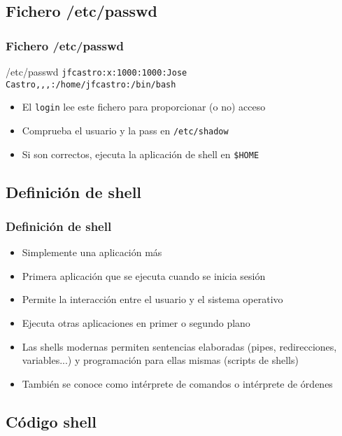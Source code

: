 \documentclass{beamer}
\begin{document}
\subsection{Fichero /etc/passwd}

\begin{frame}
  \frametitle{Fichero /etc/passwd}
  \begin{block}{/etc/passwd}
    \texttt{\tiny{jfcastro:x:1000:1000:Jose Castro,,,:/home/jfcastro:/bin/bash}}
  \end{block}
  \medskip
  \begin{itemize}
    \item El \texttt{login} lee este fichero para proporcionar (o no) acceso
    \medskip
    \item Comprueba el usuario y la pass en \texttt{/etc/shadow}
    \item Si son correctos, ejecuta la aplicación de shell en \texttt{\$HOME}
  \end{itemize}
\end{frame}

\subsection{Definición de shell}

\begin{frame}
  \frametitle{Definición de shell}
  \begin{itemize}
    \item Simplemente una aplicación más
    \item Primera aplicación que se ejecuta cuando se inicia sesión
    \medskip
    \item Permite la interacción entre el usuario y el sistema operativo
    \item Ejecuta otras aplicaciones en primer o segundo plano
    \medskip
    \item Las shells modernas permiten sentencias elaboradas (pipes, redirecciones, variables...) y programación para ellas mismas (scripts de shells)
    \medskip
    \item También se conoce como intérprete de comandos o intérprete de órdenes
  \end{itemize}
\end{frame}


\subsection{Código shell}
\end{document}
